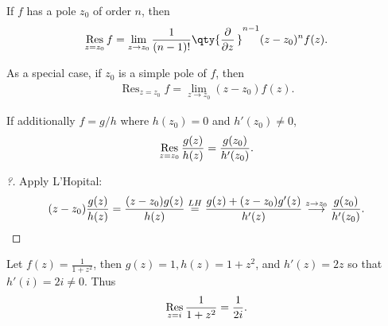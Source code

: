 \begin{proposition}

If \(f\) has a pole \(z_0\) of order \(n\), then
\begin{align*}  
\mathop{\mathrm{Res}}_{z=z_0} f = \lim_{z\to z_0} {1 \over (n-1)!} \qty{{\frac{\partial }{\partial z}\,}}^{n-1} (z-z_0)^n f(z)
.\end{align*}

\end{proposition}

\begin{proposition}

As a special case, if \(z_0\) is a simple pole of \(f\), then
\begin{align*}  
\mathop{\mathrm{Res}}_{z=z_0}f = \lim_{z\to z_0} (z-z_0) f(z)
.\end{align*}

\end{proposition}

\begin{corollary}

If additionally \(f=g/h\) where \(h(z_0) = 0\) and \(h'(z_0)\neq 0\),
\begin{align*}
\mathop{\mathrm{Res}}_{z=z_0} {g(z) \over h(z)} = {g(z_0) \over h'(z_0)}
.\end{align*}

\end{corollary}

\begin{proof}[?]

Apply L'Hopital:
\begin{align*}
(z-z_0) {g(z) \over h(z)} = {(z-z_0) g(z) \over h(z) } \overset{LH}{=}
{g(z) + (z-z_0) g'(z) \over h'(z)} \overset{z\to z_0}\longrightarrow{g(z_0) \over h'(z_0)}
.\end{align*}

\end{proof}

\begin{example}

Let \(f(z) = \frac{1}{1+z^2}\), then \(g(z) = 1, h(z) = 1+z^2\), and
\(h'(z) = 2z\) so that \(h'(i) = 2i \neq 0\). Thus
\begin{align*}
\mathop{\mathrm{Res}}_{z=i}{1\over 1+z^2} = \frac{1}{2i}
.\end{align*}

\end{example}

